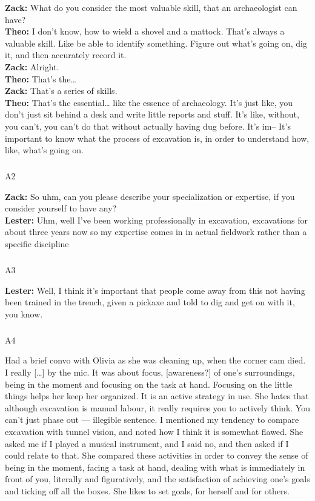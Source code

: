 \documentclass[
]{article}
\makeatletter
\let\oldsubparagraph\subparagraph
\renewcommand{\subparagraph}{
    \@ifstar
      \xxxSubParagraphStar
      \xxxSubParagraphNoStar
  }
\newcommand{\xxxSubParagraphStar}[1]{\oldsubparagraph*{#1}\mbox{}}
\newcommand{\xxxSubParagraphNoStar}[1]{\oldsubparagraph{#1}\mbox{}}
\makeatother
\begin{document}
\textbf{Zack:} What do you consider the most valuable skill, that an
archaeologist can have?\\
\textbf{Theo:} I don't know, how to wield a shovel and a mattock. That's
always a valuable skill. Like be able to identify something. Figure out
what's going on, dig it, and then accurately record it.\\
\textbf{Zack:} Alright.\\
\textbf{Theo:} That's the\ldots{}\\
\textbf{Zack:} That's a series of skills.\\
\textbf{Theo:} That's the essential\ldots{} like the essence of
archaeology. It's just like, you don't just sit behind a desk and write
little reports and stuff. It's like, without, you can't, you can't do
that without actually having dug before. It's im-- It's important to
know what the process of excavation is, in order to understand how,
like, what's going on.

\subparagraph{A2}\label{sec-A2}

\textbf{Zack:} So uhm, can you please describe your specialization or
expertise, if you consider yourself to have any?\\
\textbf{Lester:} Uhm, well I've been working professionally in
excavation, excavations for about three years now so my expertise comes
in in actual fieldwork rather than a specific discipline

\subparagraph{A3}\label{sec-A3}

\textbf{Lester:} Well, I think it's important that people come away from
this not having been trained in the trench, given a pickaxe and told to
dig and get on with it, you know.

\subparagraph{A4}\label{sec-A4}

Had a brief convo with Olivia as she was cleaning up, when the corner
cam died. I really {[}\ldots{]} by the mic. It was about focus,
{[}awareness?{]} of one's surroundings, being in the moment and focusing
on the task at hand. Focusing on the little things helps her keep her
organized. It is an active strategy in use. She hates that although
excavation is manual labour, it really requires you to actively think.
You can't just phase out --- illegible sentence. I mentioned my tendency
to compare excavation with tunnel vision, and noted how I think it is
somewhat flawed. She asked me if I played a musical instrument, and I
said no, and then asked if I could relate to that. She compared these
activities in order to convey the sense of being in the moment, facing a
task at hand, dealing with what is immediately in front of you,
literally and figuratively, and the satisfaction of achieving one's
goals and ticking off all the boxes. She likes to set goals, for herself
and for others.
\end{document}
